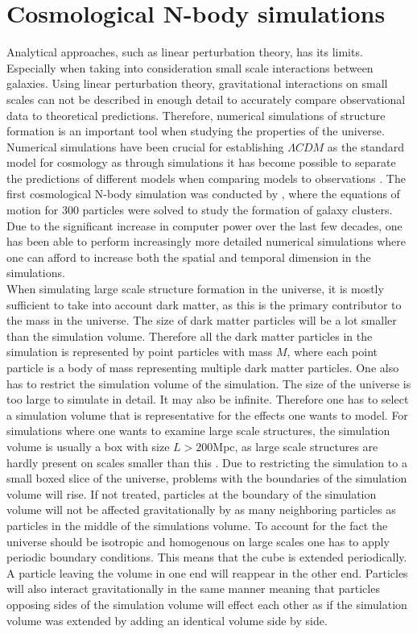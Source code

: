 \section{Cosmological N-body simulations}
Analytical approaches, such as linear perturbation theory, has its limits.
Especially when taking into consideration small scale interactions between
galaxies. Using linear perturbation theory, gravitational interactions on small scales can not be described in
enough detail to accurately compare observational data to theoretical
predictions. Therefore, numerical simulations of structure formation is an
important tool when studying the properties of the universe. Numerical
simulations have been crucial for establishing $\Lambda CDM$ as the standard
model for cosmology as through simulations it has become possible to separate
the predictions of different models when comparing models to observations
\cite[p.~361]{schneider2006extragalactic}. The first cosmological N-body
simulation was conducted by \cite{PeeblesPJE1970SotC}, where the equations of
motion for $300$ particles were solved to study the formation of galaxy clusters. Due to the significant increase in
computer power over the last few decades, one has been able to perform
increasingly more detailed numerical simulations where one can afford to
increase both the spatial and temporal dimension in the simulations.\\

When simulating large scale structure formation in the universe, it is mostly
sufficient to take into account dark matter, as this is the primary contributor
to the mass in the universe. The size of dark matter particles will be a lot smaller than the simulation volume. Therefore
all the dark matter particles in the simulation is represented by point
particles with mass $M$, where each point particle is a body of mass
representing multiple dark matter particles. One also has to restrict the
simulation volume of the simulation. The size of the universe is too large to
simulate in detail. It may also be infinite. Therefore one has to select a
simulation volume that is representative for the effects one wants to model. For
simulations where one wants to examine large scale structures, the simulation
volume is usually a box with size $L>200$Mpc, as large scale structures are hardly present on
scales smaller than this \cite[p.~362]{schneider2006extragalactic}. Due to
restricting the simulation to a small boxed slice of the universe, problems with
the boundaries of the simulation volume will rise. If not treated, particles at
the boundary of the simulation volume will not be affected gravitationally by as many
neighboring particles as particles in the middle of the simulations volume. To
account for the fact the universe should be isotropic and homogenous on large
scales one has to apply periodic boundary conditions. This means that the cube
is extended periodically. A particle leaving the volume in one end will reappear
in the other end. Particles will also interact gravitationally in the same
manner meaning that particles opposing sides of the simulation volume will
effect each other as if the simulation volume was extended by adding an
identical volume side by side.

